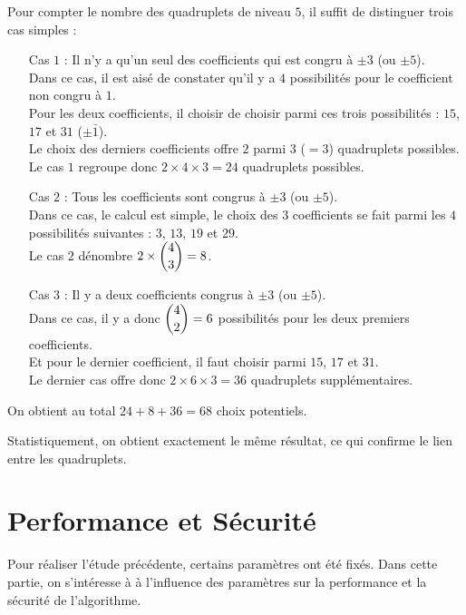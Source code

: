 \documentclass[12pt, a4paper]{memoir}
\begin{document}
 \begin{Remarque}
  Pour compter le nombre des quadruplets de niveau $5$, il suffit de distinguer trois cas simples :
  \begin{itemize}
   \item [Cas $1$ :] Il n'y a qu'un seul des coefficients qui est congru à $\pm 3$ (ou $\pm 5$). \\
   Dans ce cas, il est aisé de constater qu'il y a $4$ possibilités pour le coefficient non congru à $1$. \\
   Pour les deux coefficients, il choisir de choisir parmi ces trois possibilités : $15$, $17$ et $31$ ($\pm \bar{1}$). \\
   Le choix des derniers coefficients offre $2$ parmi $3$ ($= 3$) quadruplets possibles. \\
   Le cas $1$ regroupe donc $2 \times 4 \times 3 = 24$ quadruplets possibles.
   \item [Cas $2$ :] Tous les coefficients sont congrus à $\pm 3$ (ou $\pm 5$). \\
   Dans ce cas, le calcul est simple, le choix des $3$ coefficients se fait parmi les $4$ possibilités suivantes :
   $3$, $13$, $19$ et $29$. \\
   Le cas $2$ dénombre $2 \times \dbinom{4}{3} = 8$.
   \item [Cas $3$ :] Il y a deux coefficients congrus à $\pm 3$ (ou $\pm 5$). \\
   Dans ce cas, il y a donc $\dbinom{4}{2} = 6$ possibilités pour les deux premiers coefficients. \\
   Et pour le dernier coefficient, il faut choisir parmi $15$, $17$ et $31$. \\
   Le dernier cas offre donc $2 \times 6 \times 3 = 36$ quadruplets supplémentaires.
  \end{itemize}
  
  On obtient au total $24 + 8 + 36 = 68$ choix potentiels.
  
  Statistiquement, on obtient exactement le même résultat, ce qui confirme le lien entre les quadruplets.
  \end{Remarque}

  \section{Performance et Sécurité}
  
  Pour réaliser l'étude précédente,  certains paramètres ont été fixés. Dans cette partie, on s'intéresse à 
  à l'influence des paramètres sur la performance et la sécurité de l'algorithme.
    
\end{document}
